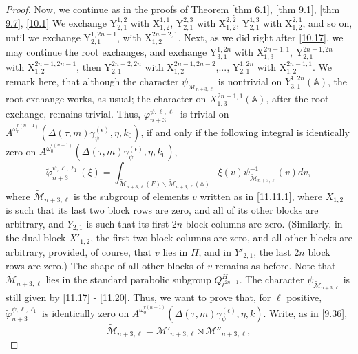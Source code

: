 \documentclass[12pts]{amsart}
\newcommand{\BA}{{\mathbb {A}}}
\begin{document}
\begin{proof}
Now, we continue as in the proofs of Theorem \ref{thm 6.1}, \ref{thm 9.1},  \ref{thm 9.7}, \ref{10.1}
We exchange $\mathrm{Y}_{2,1}^{1,2}$ with $\mathrm{X}_{1,2}^{1,1}$, $\mathrm{Y}_{2,1}^{2,3}$ with $\mathrm{X}_{1,2}^{2,2}$,  
$\mathrm{Y}_{2,1}^{1,3}$ with $\mathrm{X}_{1,2}^{2,1}$, and so on, until we exchange $\mathrm{Y}_{2,1}^{1,2n-1}$, with $\mathrm{X}_{1,2}^{2n-2,1}$. Next, as we did right after \eqref{10.17}, we may continue the root exchanges, and exchange $\mathrm{Y}_{3,1}^{1,2n}$ with $\mathrm{X}_{1,3}^{2n-1,1}$, $\mathrm{Y}_{2,1}^{2n-1,2n}$ with $\mathrm{X}_{1,2}^{2n-1,2n-1}$, then  $\mathrm{Y}_{2,1}^{2n-2,2n}$ with $\mathrm{X}_{1,2}^{2n-1,2n-2}$,..., $\mathrm{Y}_{2,1}^{1,2n}$ with $\mathrm{X}_{1,2}^{2n-1,1}$. We remark here, that although the character $\psi_{\mathcal{M}_{n+3,\ell}}$ is nontrivial on $Y_{3,1}^{1,2n}(\BA)$, the root exchange works, as usual; the character on $X_{1,3}^{2n-1,1}(\BA)$, after the root exchange, remains trivial. Thus, $\varphi_{n+3}^{\psi,\ell,\ell_1}$ is trivial on $A^{\omega_0^{r(n-1)}}(\Delta(\tau,m)\gamma_\psi^{(\epsilon)},\eta,k_0)$, if and only if the following integral is identically zero on $A^{\omega_0^{r(n-1)}}(\Delta(\tau,m)\gamma_\psi^{(\epsilon)},\eta,k_0)$, 
 \begin{equation}\label{11.21}
 \tilde{\varphi}_{n+3}^{\psi,\ell,\ell_1}(\xi)=
 \int_{\tilde{\mathcal{M}}_{n+3,\ell}(F)\backslash
 	\tilde{\mathcal{M}}_{n+3,\ell}(\BA)}\xi(v)\psi^{-1}_{\tilde{\mathcal{M}}_{n+3,\ell}}(v)dv, 
 \end{equation}
 where $\tilde{\mathcal{M}}_{n+3,\ell}$ is the subgroup of elements $v$ written as in \eqref{11.11.1}, where $X_{1,2}$ is such that its last two block rows are zero, and all of its other blocks are arbitrary, and $Y_{2,1}$ is such that its first $2n$ block columns are zero. (Similarly, in the dual block $X'_{1,2}$, the first two block columns are zero, and all other blocks are arbitrary, provided, of course, that $v$ lies in $H$, and in $Y'_{2,1}$, the last $2n$ block rows are zero.) The shape of all other blocks of $v$ remains as before. Note that $\tilde{\mathcal{M}}_{n+3,\ell}$ lies in the standard parabolic subgroup $Q^H_{\ell^{2n-1}}$.  The character $\psi_{\tilde{\mathcal{M}}_{n+3,\ell}}$ is still given by \eqref{11.17} - \eqref{11.20}. Thus, we want to prove that, for $\ell$ positive, $\tilde{\varphi}_{n+3}^{\psi,\ell,\ell_1}$ is identically zero on $A^{\omega_0^{r(n-1)}}(\Delta(\tau,m)\gamma_\psi^{(\epsilon)},\eta,k)$.  
 Write, as in \eqref{9.36},
 \begin{equation}\label{11.22}
 \tilde{\mathcal{M}}_{n+3,\ell}=\mathcal{M}'_{n+3,\ell}\rtimes\mathcal{M}''_{n+3,\ell},

\end{equation}
\end{proof}
\end{document}
